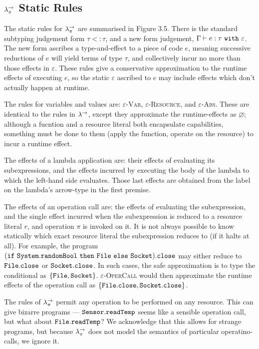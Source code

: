  
 
 
 
 
 
\subsection{$\lambda^{\rightarrow}_{\pi}$ Static Rules}

The static rules for $\lambda^{\rightarrow}_{\pi}$ are summarised in Figure 3.5. There is the standard subtyping judgement form $\tau <: \tau$, and a new form judgement, $\Gamma \vdash e: \tau~\mathtt{with}~ \varepsilon$. The new form ascribes a type-and-effect to a piece of code $e$, meaning successive reductions of $e$ will yield terms of type $\tau$, and collectively incur no more than those effects in $\varepsilon$. These rules give a conservative approximation to the runtime effects of executing $e$, so the static $\varepsilon$ ascribed to $e$ may include effects which don't actually happen at runtime.

The rules for variables and values are: \textsc{$\varepsilon$-Var}, \textsc{$\varepsilon$-Resource}, and \textsc{$\varepsilon$-Abs}. These are identical to the rules in $\lambda^{\rightarrow}$, except they approximate the runtime-effects as $\varnothing$; although a fucntion and a resource literal both encapsulate capabilities, something must be done to them (apply the function, operate on the resource) to incur a runtime effect.

The effects of a lambda application are: their effects of evaluating its subexpressions, and the effects incurred by executing the body of the lambda to which the left-hand side evaluates. Those last effects are obtained from the label on the lambda's arrow-type in the first premise.

The effects of an operation call are: the effects of evaluating the subexpression, and the single effect incurred when the subexpression is reduced to a resource literal $r$, and operation $\pi$ is invoked on it. It is not always possible to know statically which exact resource literal the subexpression reduces to (if it halts at all). For example, the program $\mathtt{(if~System.randomBool~then~File~else~Socket).close}$ may either reduce to $\mathtt{File.close}$ or $\mathtt{Socket.close}$. In such cases, the safe approximation is to type the conditional as $\{ \mathtt{File, Socket} \}$. \textsc{$\varepsilon$-OperCall} would then approximate the runtime effects of the operation call as  $\{ \mathtt{File.close, Socket.close} \}$.

The rules of $\lambda^{\rightarrow}_{\pi}$ permit any operation to be performed on any resource. This can give bizarre programs --- $\mathtt{Sensor.readTemp}$ seems like a sensible operation call, but what about $\mathtt{File.readTemp}$? We acknowledge that this allows for strange programs, but because $\lambda^{\rightarrow}_{\pi}$ does not model the semantics of particular operatino-calls, we ignore it.

